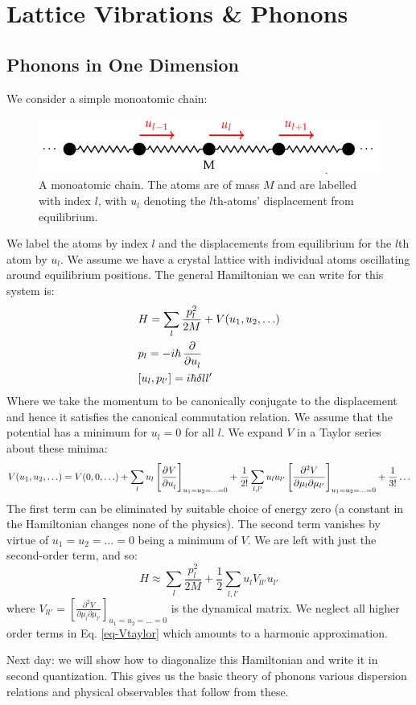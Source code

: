 \section{Lattice Vibrations \& Phonons}
\subsection{Phonons in One Dimension}
We consider a simple monoatomic chain:
\begin{figure}[htbp]
    \centering
    \includegraphics[]{Images/fig-monochaincartoon.pdf}

    \caption{A monoatomic chain. The atoms are of mass $M$ and are labelled with index $l$, with $u_l$ denoting the $l$th-atoms' displacement from equilibrium.}
    \label{fig-monochaincartoon}
\end{figure}
We label the atoms by index $l$ and the displacements from equilibrium for the $l$th atom by $u_l$. We assume we have a crystal lattice with individual atoms oscillating around equilibrium positions. The general Hamiltonian we can write for this system is:
\begin{equation}
    \begin{split}
        &H = \sum_l \frac{p_l^2}{2M} + V(u_1, u_2, \ldots)
        \\ &p_l = -i\hbar\dpd{}{u_l}
        \\ &[u_l, p_{l'}] = i\hbar\delta{ll'} 
    \end{split}
\end{equation}
Where we take the momentum to be canonically conjugate to the displacement and hence it satisfies the canonical commutation relation. We assume that the potential has a minimum for $u_l = 0$ for all $l$. We expand $V$ in a Taylor series about these minima:
\begin{equation}\label{eq-Vtaylor}
    V(u_1, u_2, \ldots) = V(0, 0, \ldots ) + \sum_l u_l \left[\dpd{V}{u_l}\right]_{u_1=u_2=\ldots = 0} + \frac{1}{2!}\sum_{l, l'}u_lu_{l'}\left[\frac{\partial^2 V}{\partial \mu_l \partial \mu_{l'}}\right]_{u_1=u_2=\ldots=0} + \frac{1}{3!} \ldots
\end{equation}
The first term can be eliminated by suitable choice of energy zero (a constant in the Hamiltonian changes none of the physics). The second term vanishes by virtue of $u_1 = u_2 = \ldots = 0$ being a minimum of $V$. We are left with just the second-order term, and so:
\begin{equation}
    H \approx \sum_l \frac{p_l^2}{2M} + \frac{1}{2}\sum_{l, l'}u_l V_{ll'}u_{l'}
\end{equation}
where $V_{ll'} = \left[\frac{\partial^2 V}{\partial \mu_l \partial \mu_{l'}}\right]_{u_1=u_2=\ldots=0}$ is the dynamical matrix. We neglect all higher order terms in Eq. \eqref{eq-Vtaylor} which amounts to a harmonic approximation.

Next day: we will show how to diagonalize this Hamiltonian and write it in second quantization. This gives us the basic theory of phonons various dispersion relations and physical observables that follow from these.